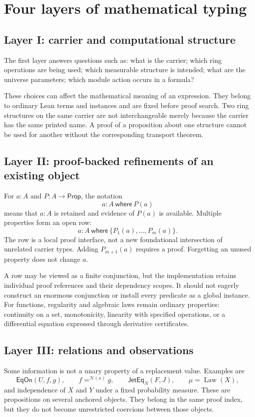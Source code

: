 \documentclass[11pt,a4paper]{article}
\newcommand{\Prop}{\mathsf{Prop}}
\newcommand{\EqOn}{\mathsf{EqOn}}
\newcommand{\Jet}{\mathsf{JetEq}}
\theoremstyle{definition}
\begin{document}
\section{Four layers of mathematical typing}\label{sec:layers}
\subsection{Layer I: carrier and computational structure}
The first layer answers questions such as: what is the carrier; which ring
operations are being used; which measurable structure is intended; what are the
universe parameters; which module action occurs in a formula?

These choices can affect the mathematical meaning of an expression. They belong
to ordinary Lean terms and instances and are fixed before proof search. Two
ring structures on the same carrier are not interchangeable merely because the
carrier has the same printed name. A proof of a proposition about one structure
cannot be used for another without the corresponding transport theorem.

\subsection{Layer II: proof-backed refinements of an existing object}
For $a:A$ and $P:A\to\Prop$, the notation
\[
 a : A\ \mathsf{where}\ P(a)
\]
means that $a:A$ is retained and evidence of $P(a)$ is available. Multiple
properties form an open row:
\[
 a : A\ \mathsf{where}\ \{P_1(a),\ldots,P_m(a)\}.
\]
The row is a local proof interface, not a new foundational intersection of
unrelated carrier types. Adding $P_{m+1}(a)$ requires a proof. Forgetting an
unused property does not change $a$.

A row may be viewed as a finite conjunction, but the implementation retains
individual proof references and their dependency scopes. It should not eagerly
construct an enormous conjunction or install every predicate as a global
instance. For functions, regularity and algebraic laws remain ordinary
properties: continuity on a set, monotonicity, linearity with specified
operations, or a differential equation expressed through derivative certificates.

\subsection{Layer III: relations and observations}
Some information is not a unary property of a replacement value. Examples are
\[
 \EqOn(U,f,g),\qquad f=^{\mathcal N(x)}g,\qquad
 \Jet_N(F,J),\qquad \mu=\operatorname{Law}(X),
\]
and independence of $X$ and $Y$ under a fixed probability measure.
These are propositions on several anchored objects. They belong in the same
proof index, but they do not become unrestricted coercions between those
objects.
\end{document}
